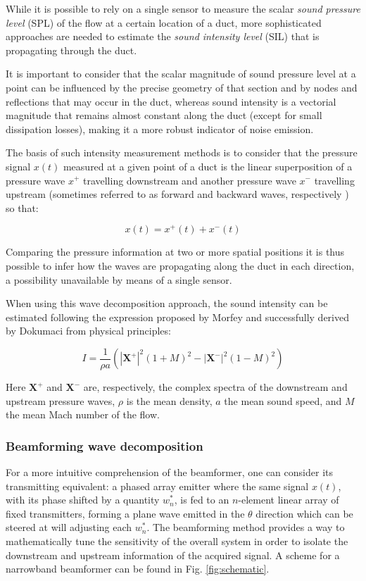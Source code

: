 While it is possible \cite{figurella2014noise} to rely on a single sensor to measure the scalar \emph{sound pressure level} (SPL) of the flow at a certain location of a duct, more sophisticated approaches are needed to estimate the \emph{sound intensity level} (SIL) that is propagating through the duct.

It is important to consider that the scalar magnitude of sound pressure level at a point can be influenced by the precise geometry of that section and by nodes and reflections that may occur in the duct, whereas sound intensity is a vectorial magnitude that remains almost constant along the duct (except for small dissipation losses), making it a more robust indicator of noise emission.

The basis of such intensity measurement methods is to consider that the pressure signal $x(t)$ measured at a given point of a duct is the linear superposition of a pressure wave $x^+$ travelling downstream and another pressure wave $x^-$ travelling upstream (sometimes referred to as forward and backward waves, respectively \cite{pinero2000estimation}) so that:

\begin{equation}
  x(t)=x^+(t)+x^-(t)
\end{equation}

Comparing the pressure information at two or more spatial positions it is thus possible to infer how the waves are propagating along the duct in each direction, a possibility unavailable by means of a single sensor.

When using this wave decomposition approach, the sound intensity can be estimated following the expression proposed by Morfey \cite{morfey1971sound} and successfully derived by Dokumaci \cite{dokumaci2000calculation} from physical principles:

\begin{equation}\label{eq:metod_intensity}
    I=\frac{1}{\rho a}\left(|\mathbf X^+ |^2(1+M)^2-|\mathbf X^- |^2(1-M)^2\right)
\end{equation}

Here $\mathbf X^+$ and $\mathbf X^-$ are, respectively, the complex spectra of the downstream and upstream pressure waves, $\rho$ is the mean density, $a$ the mean sound speed, and $M$ the mean Mach number of the flow.

\subsubsection{Beamforming wave decomposition}\label{sub:method_beamformer}
For a more intuitive comprehension of the beamformer, one can consider its transmitting equivalent: a phased array emitter where the same signal $x(t)$, with its phase shifted by a quantity $w_n^*$, is fed to an $n$-element linear array of fixed transmitters, forming a plane wave emitted in the $\theta$ direction which can be steered at will adjusting each $w_n^*$.
The beamforming method provides a way to mathematically tune the sensitivity of the overall system in order to isolate the downstream and upstream information of the acquired signal. A scheme for a narrowband beamformer can be found in Fig. \ref{fig:schematic}.

